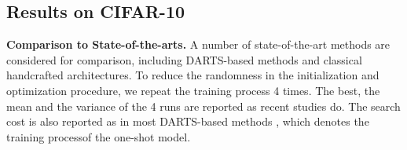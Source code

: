 \documentclass[journal]{IEEEtran}
\begin{document}
\subsection{Results on CIFAR-10}
\label{EXP.Res}
\textbf{Comparison to State-of-the-arts.} A number of state-of-the-art methods are considered for comparison, including DARTS-based methods and classical handcrafted architectures. To reduce the randomness in the initialization and optimization procedure, we repeat the training process 4 times. The best, the mean and the variance of the 4 runs are reported as recent studies do. The search cost is also reported as in most DARTS-based methods \cite{DBLP:conf/iclr/LiuSY19, DBLP:journals/corr/abs-1907-05737, DBLP:journals/corr/abs-1904-12760, DBLP:journals/corr/abs-1909-06035, DBLP:journals/corr/abs-1909-09656, DBLP:conf/iclr/Wang21, DBLP:journals/corr/abs-1910-11831}, which denotes the training processof the one-shot model. 
\end{document}
